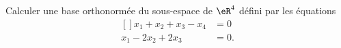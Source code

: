 

\begin{exercice}\label{exoINGE1121La0002}

Calculer une base orthonormée du sous-espace de $\eR^4$ défini par les équations
\begin{equation}
	\begin{aligned}[]
		x_1+x_2+x_3-x_4&=0\\
		x_1-2x_2+2x_3&=0.
	\end{aligned}
\end{equation}

\end{exercice}
